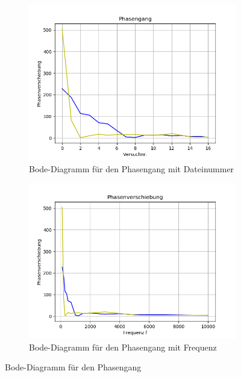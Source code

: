 \documentclass[12pt, oneside, a4paper, \docLanguage]{report}
\begin{document}
\begin{figure}[H]
\centering
\begin{subfigure}{.5\textwidth}
  \centering
  \includegraphics[width=0.9\linewidth]{../data/img/phasenanzahl.png}
  \caption{Bode-Diagramm für den Phasengang mit Dateinummer}
  \label{fig:Bode-Diagramm fürden Phasengang mit Dateinummer}
\end{subfigure}%
\begin{subfigure}{.5\textwidth}
  \centering
  \includegraphics[width=0.9\linewidth]{../data/img/phasenfrequenz.png}
  \caption{Bode-Diagramm für den Phasengang mit Frequenz}
  \label{fig:Bode-Diagramm für den Phasengang mit Frequenz}
\end{subfigure}
\caption{Bode-Diagramm für den Phasengang}
\label{fig:Bode-Diagramm für den Phasengang}
\end{figure}
\end{document}
